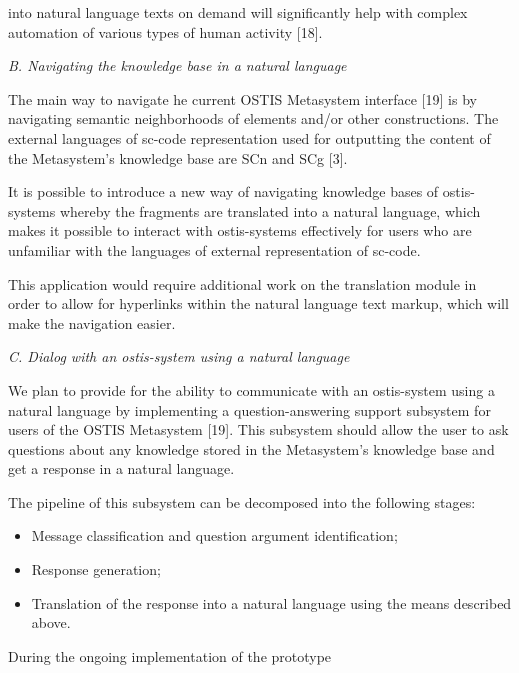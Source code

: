 \documentclass[twocolumn]{scndocument}
\begin{document}
into natural language texts on demand will significantly
help with complex automation of various types of human
activity [18].
\par  \vspace{2.5mm} \small\textit{B. Navigating the knowledge base in a natural language}
\par \vspace{2.5mm} The main way to navigate he current OSTIS Metasystem interface [19] is by navigating semantic neighborhoods of elements and/or other constructions. The
external languages of sc-code representation used for
outputting the content of the Metasystem’s knowledge
base are SCn and SCg [3].
\par It is possible to introduce a new way of navigating
knowledge bases of ostis-systems whereby the fragments
are translated into a natural language, which makes it
possible to interact with ostis-systems effectively for
users who are unfamiliar with the languages of external
representation of sc-code.
\par This application would require additional work on the
translation module in order to allow for hyperlinks within
the natural language text markup, which will make the
navigation easier.
\par  \vspace{1mm} 
\begin{flushleft}
 \textit{C. Dialog with an ostis-system using a natural language}
\end{flushleft} \par We plan to provide for the ability to communicate with
an ostis-system using a natural language by implementing
a question-answering support subsystem for users of the
OSTIS Metasystem [19]. This subsystem should allow
the user to ask questions about any knowledge stored in
the Metasystem’s knowledge base and get a response in
a natural language.
\par The pipeline of this subsystem can be decomposed into
the following stages:
\begin{itemize}
  \item Message classification and question argument identification;
 \item  Response generation;
 \item Translation of the response into a natural language
using the means described above.
\end{itemize}
\par \vspace{1.5mm} During the ongoing implementation of the prototype
\end{document}
